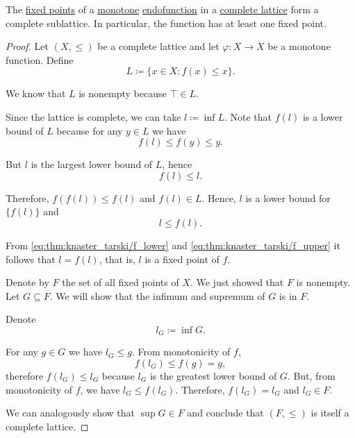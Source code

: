 \begin{theorem}\label{thm:knaster_tarski_theorem}
  The \hyperref[def:fixed_point]{fixed points} of a \hyperref[def:partially_ordered_set/homomorphism]{monotone} \hyperref[def:multi_valued_function/endofunction]{endofunction} in a \hyperref[def:semilattice/lattice]{complete lattice} form a complete sublattice. In particular, the function has at least one fixed point.
\end{theorem}
\begin{proof}
  Let \( (X, \leq) \) be a complete lattice and let \( \varphi: X \to X \) be a monotone function. Define
  \begin{equation*}
    L \coloneqq \{ x \in X \colon f(x) \leq x \}.
  \end{equation*}

  We know that \( L \) is nonempty because \( \top \in L \).

  Since the lattice is complete, we can take \( l \coloneqq \inf L \). Note that \( f(l) \) is a lower bound of \( L \) because for any \( y \in L \) we have
  \begin{equation*}
    f(l) \leq f(y) \leq y.
  \end{equation*}

  But \( l \) is the largest lower bound of \( L \), hence
  \begin{equation}\label{eq:thm:knaster_tarski/f_lower}
    f(l) \leq l.
  \end{equation}

  Therefore, \( f(f(l)) \leq f(l) \) and \( f(l) \in L \). Hence, \( l \) is a lower bound for \( \{ f(l) \} \) and
  \begin{equation}\label{eq:thm:knaster_tarski/f_upper}
    l \leq f(l).
  \end{equation}

  From \eqref{eq:thm:knaster_tarski/f_lower} and \eqref{eq:thm:knaster_tarski/f_upper} it follows that \( l = f(l) \), that is, \( l \) is a fixed point of \( f \).

  Denote by \( F \) the set of all fixed points of \( X \). We just showed that \( F \) is nonempty. Let \( G \subseteq F \). We will show that the infimum and supremum of \( G \) is in \( F \).

  Denote
  \begin{equation*}
    l_G \coloneqq \inf G.
  \end{equation*}

  For any \( g \in G \) we have \( l_G \leq g \). From monotonicity of \( f \),
  \begin{equation*}
    f(l_G) \leq f(g) = g,
  \end{equation*}
  therefore \( f(l_G) \leq l_G \) because \( l_G \) is the greatest lower bound of \( G \). But, from monotonicity of \( f \), we have \( l_G \leq f(l_G) \). Therefore, \( f(l_G) = l_G \) and \( l_G \in F \).

  We can analogously show that \( \sup G \in F \) and conclude that \( (F, \leq) \) is itself a complete lattice.
\end{proof}

